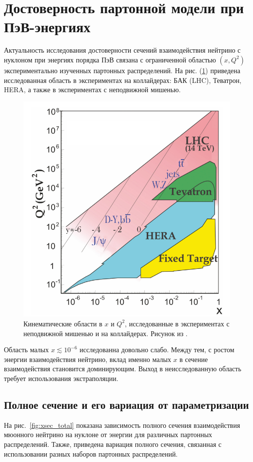 \section{Достоверность партонной модели при ПэВ-энергиях}
Актуальность исследования достоверности сечений взаимодействия нейтрино с нуклоном при энергиях порядка ПэВ связана с ограниченной областью  $(x, Q^2)$ экспериментально изученных партонных распределений. На рис. (\ref{fig:xQ2_PDG}) приведена исследованная область в экспериментах на коллайдерах:   БАК (LHC), Теватрон, HERA, а также в экспериментах с неподвижной мишенью.  
\begin{figure}[!h]
\centering
\includegraphics[width=\linewidth]{images/NuProp/reald}
\caption{Кинематические области в $x$ и $Q^2$, исследованные в экспериментах с неподвижной мишенью и на коллайдерах. Рисунок из \cite{ParticleDataGroup:2024cfk}.}
\label{fig:xQ2_PDG}
\end{figure}
Область малых $x\lesssim 10^{-6}$ исследованна довольно слабо. Между тем, с ростом энергии взаимодействия нейтрино, вклад именно малых $x$ в сечение взаимодействия становится доминирующим. Выход в неисследованную область требует использования экстраполяции. 


\subsection{Полное сечение и его вариация от параметризации}
На рис.~\ref{fig:xsec_total} показана зависимость полного сечения взаимодействия мюонного нейтрино на нуклоне от энергии для различных партонных распределений. Также, приведена вариация полного сечения, связанная с использовании разных наборов партонных распределений.

